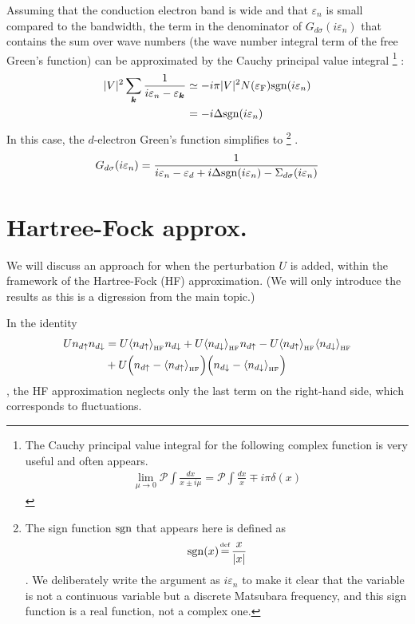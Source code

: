 \documentclass[a4j]{jarticle}
\begin{document}
Assuming that the conduction electron band is wide and that $\varepsilon_{n}$ is small compared to the bandwidth, the term in the denominator of $G_{d \sigma}(i \varepsilon_{n})$ that contains the sum over wave numbers (the wave number integral term of the free Green's function) can be approximated by the Cauchy principal value integral
\footnote{
	The Cauchy principal value integral for the following complex function is very useful and often appears.
	\begin{align}
		\lim_{\mu \to 0}
		\mathcal{P}
		\int
		\frac{dx}{x \pm i \mu}
		=
		\mathcal{P}
		\int
		\frac{dx}{x}
		\mp i \pi
		\delta(x)
	\end{align}
}
:
\begin{align}
	|V|^{2}
	\sum_{\bm{k}}
	\frac{1}{
		i \varepsilon_{n} - \varepsilon_{\bm{k}}
	}
	 & \simeq
	-
	i
	\pi
	|V|^{2}
	N(\varepsilon_{\rm F})
	{\rm sgn}(i \varepsilon_{n})
	\nonumber \\
	 & =
	-i \Delta {\rm sgn}(i \varepsilon_{n})
\end{align}
In this case, the $d$-electron Green's function simplifies to
\footnote{
	The sign function ${\rm sgn}$ that appears here is defined as
	\begin{align}
		{\rm sgn}(x)
		\ \!
		{=^{{}^{\hspace{-3mm} \rm def }}}
		\frac{x}{|x|}
	\end{align}
	.
	We deliberately write the argument as $i \varepsilon_{n}$ to make it clear that the variable is not a continuous variable but a discrete Matsubara frequency, and this sign function is a real function, not a complex one.
}
.
\begin{align}
	G_{d \sigma}(i \varepsilon_{n})
	=
	\frac{1}{
		\displaystyle
		i \varepsilon_{n}
		-
		\varepsilon_{d}
		+
		i \Delta {\rm sgn}(i \varepsilon_{n})
		-
		\Sigma_{d\sigma}(i \varepsilon_{n})
	}
\end{align}

\section*{Hartree-Fock approx.}

We will discuss an approach for when the perturbation $U$ is added, within the framework of the Hartree-Fock (HF) approximation.
(We will only introduce the results as this is a digression from the main topic.)

In the identity
\begin{align}
	U
	n_{d \uparrow}
	n_{d \downarrow}
	 & =
	U
	\langle n_{d \uparrow} \rangle_{{}_{\rm HF}}
	n_{d \downarrow}
	+
	U
	\langle n_{d \downarrow} \rangle_{{}_{\rm HF}}
	n_{d \uparrow}
	-
	U
	\langle n_{d \uparrow} \rangle_{{}_{\rm HF}}
	\langle n_{d \downarrow} \rangle_{{}_{\rm HF}}
	\nonumber \\ &+
	U
	\Big(
	n_{d \uparrow}
	-
	\langle n_{d \uparrow} \rangle_{{}_{\rm HF}}
	\Big)
	\Big(
	n_{d \downarrow}
	-
	\langle n_{d \downarrow} \rangle_{{}_{\rm HF}}
	\Big)
	\label{eqn:HF17}
\end{align}
, the HF approximation neglects only the last term on the right-hand side, which corresponds to fluctuations.
\end{document}

